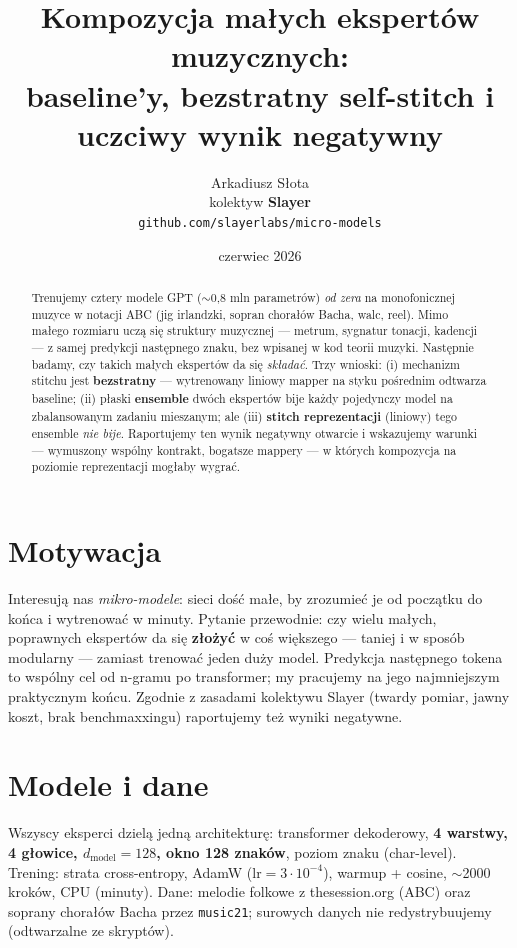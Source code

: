 \documentclass[11pt]{article}
\title{Kompozycja małych ekspertów muzycznych:\\ baseline'y, bezstratny self-stitch i uczciwy wynik negatywny}
\author{Arkadiusz Słota \\ kolektyw \textbf{Slayer} \\ \texttt{github.com/slayerlabs/micro-models}}
\date{czerwiec 2026}
\begin{document}
\maketitle

\begin{abstract}
Trenujemy cztery modele GPT ($\sim$0{,}8 mln parametrów) \emph{od zera} na monofonicznej muzyce w notacji ABC
(jig irlandzki, sopran chorałów Bacha, walc, reel). Mimo małego rozmiaru uczą się struktury muzycznej --- metrum,
sygnatur tonacji, kadencji --- z samej predykcji następnego znaku, bez wpisanej w kod teorii muzyki. Następnie
badamy, czy takich małych ekspertów da się \emph{składać}. Trzy wnioski: (i) mechanizm stitchu jest
\textbf{bezstratny} --- wytrenowany liniowy mapper na styku pośrednim odtwarza baseline; (ii) płaski
\textbf{ensemble} dwóch ekspertów bije każdy pojedynczy model na zbalansowanym zadaniu mieszanym; ale
(iii) \textbf{stitch reprezentacji} (liniowy) tego ensemble \emph{nie bije}. Raportujemy ten wynik negatywny
otwarcie i wskazujemy warunki --- wymuszony wspólny kontrakt, bogatsze mappery --- w których kompozycja na
poziomie reprezentacji mogłaby wygrać.
\end{abstract}

\section{Motywacja}
Interesują nas \emph{mikro-modele}: sieci dość małe, by zrozumieć je od początku do końca i wytrenować w minuty.
Pytanie przewodnie: czy wielu małych, poprawnych ekspertów da się \textbf{złożyć} w coś większego --- taniej i
w sposób modularny --- zamiast trenować jeden duży model. Predykcja następnego tokena to wspólny cel od n-gramu
po transformer; my pracujemy na jego najmniejszym praktycznym końcu. Zgodnie z zasadami kolektywu Slayer
(twardy pomiar, jawny koszt, brak benchmaxxingu) raportujemy też wyniki negatywne.

\section{Modele i dane}
Wszyscy eksperci dzielą jedną architekturę: transformer dekoderowy, \textbf{4 warstwy, 4 głowice,
$d_\text{model}=128$, okno 128 znaków}, poziom znaku (char-level). Trening: strata cross-entropy, AdamW
($\text{lr}=3\cdot10^{-4}$), warmup + cosine, $\sim$2000 kroków, CPU (minuty). Dane: melodie folkowe z
thesession.org (ABC) oraz soprany chorałów Bacha przez \texttt{music21}; surowych danych nie redystrybuujemy
(odtwarzalne ze skryptów).
\end{document}
